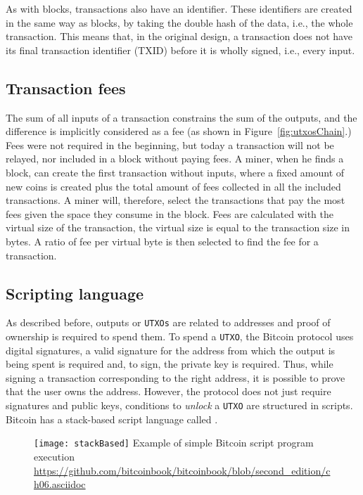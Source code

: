 As with blocks, transactions also have an identifier. These identifiers are created in the
same way as blocks, by taking the double hash of the data, i.e., the whole
transaction. This means that, in the original design, a transaction does not
have its final transaction identifier (TXID) before it is wholly signed, i.e., every
input.

\subsection{Transaction fees}

The sum of all inputs of a transaction constrains the sum of the
outputs, and the difference is implicitly considered as a fee (as
shown in Figure~\ref{fig:utxosChain}.) Fees were not required in the beginning, but
today a transaction will not be relayed, nor included in a block without paying fees. A
miner, when he finds a block, can create the first transaction without inputs,
where a fixed amount of new coins is created plus the total amount of fees
collected in all the included transactions. A miner will, therefore, select the
transactions that pay the most fees given the space they consume in the block.
Fees are calculated with the virtual size of the transaction, the virtual size is equal to
the transaction size in bytes. A ratio of fee per virtual byte is then selected
to find the fee for a transaction.

\subsection{Scripting language}

As described before, outputs or \texttt{UTXOs} are related to addresses and
proof of ownership is required to spend them. To spend a \texttt{UTXO}, the
Bitcoin protocol uses digital signatures, a valid
signature for the address from which the output is being spent is required and,
to sign, the private key is required. Thus, while signing a transaction
corresponding to the right address, it is possible to prove that the user owns
the address. However, the protocol does not just require signatures and public
keys, conditions to \textit{unlock} a \texttt{UTXO} are structured in scripts.
Bitcoin has a stack-based script language called .

\begin{figure}[H]
	\centering
	\texttt{[image: stackBased]}
  {Example of simple Bitcoin script program execution}
	{\url{https://github.com/bitcoinbook/bitcoinbook/blob/second_edition/ch06.asciidoc}}
	\label{fig:stackBased}
\end{figure}

